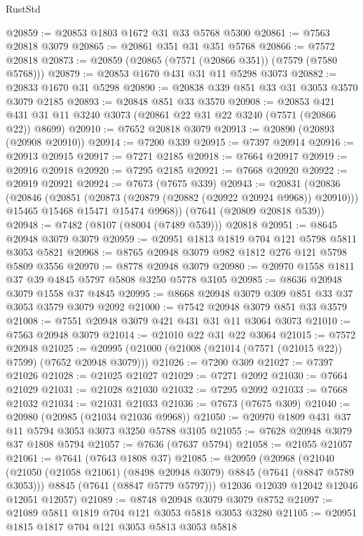 \begin{lexlean}{RustStd}
\begin{coremodule}
@20859 := @20853 @1803 @1672 @31 @33 @5768 @5300
@20861 := @7563 @20818 @3079
@20865 := @20861 @351 @31 @351 @5768
@20866 := @7572 @20818
@20873 := @20859 (@20865 (@7571 (@20866 @351)) (@7579 (@7580 @5768)))
@20879 := @20853 @1670 @431 @31 @11 @5298 @3073
@20882 := @20833 @1670 @31 @5298
@20890 := @20838 @339 @851 @33 @31 @3053 @3570 @3079 @2185
@20893 := @20848 @851 @33 @3570
@20908 := @20853 @421 @431 @31 @11 @3240 @3073 (@20861 @22 @31 @22 @3240 (@7571 (@20866 @22)) @8699)
@20910 := @7652 @20818 @3079
@20913 := @20890 (@20893 (@20908 @20910))
@20914 := @7200 @339
@20915 := @7397 @20914
@20916 := @20913 @20915
@20917 := @7271 @2185
@20918 := @7664 @20917
@20919 := @20916 @20918
@20920 := @7295 @2185
@20921 := @7668 @20920
@20922 := @20919 @20921
@20924 := @7673 (@7675 @339)
@20943 := @20831
    (@20836
      (@20846
        (@20851 (@20873 (@20879 (@20882 (@20922 @20924 @9968)) @20910)))
        @15465
        @15468
        @15471
        @15474
        @9968))
    (@7641 (@20809 @20818 @539))
@20948 := @7482 (@8107 (@8004 (@7489 @539))) @20818
@20951 := @8645 @20948 @3079 @3079
@20959 := @20951 @1813 @1819 @704 @121 @5798 @5811 @3053 @5821
@20968 := @8765 @20948 @3079 @982 @1812 @276 @121 @5798 @5809 @3556
@20970 := @8778 @20948 @3079
@20980 := @20970 @1558 @1811 @37 @39 @4845 @5797 @5808 @3250 @5778 @3105
@20985 := @8636 @20948 @3079 @1558 @37 @4845
@20995 := @8668 @20948 @3079 @309 @851 @33 @37 @3053 @3579 @3079 @2092
@21000 := @7542 @20948 @3079 @851 @33 @3579
@21008 := @7551 @20948 @3079 @421 @431 @31 @11 @3064 @3073
@21010 := @7563 @20948 @3079
@21014 := @21010 @22 @31 @22 @3064
@21015 := @7572 @20948
@21025 := @20995 (@21000 (@21008 (@21014 (@7571 (@21015 @22)) @7599) (@7652 @20948 @3079)))
@21026 := @7200 @309
@21027 := @7397 @21026
@21028 := @21025 @21027
@21029 := @7271 @2092
@21030 := @7664 @21029
@21031 := @21028 @21030
@21032 := @7295 @2092
@21033 := @7668 @21032
@21034 := @21031 @21033
@21036 := @7673 (@7675 @309)
@21040 := @20980 (@20985 (@21034 @21036 @9968))
@21050 := @20970 @1809 @431 @37 @11 @5794 @3053 @3073 @3250 @5788 @3105
@21055 := @7628 @20948 @3079 @37 @1808 @5794
@21057 := @7636 (@7637 @5794)
@21058 := @21055 @21057
@21061 := @7641 (@7643 @1808 @37)
@21085 := @20959
    (@20968
      (@21040
        (@21050 (@21058 @21061) (@8498 @20948 @3079) @8845 (@7641 (@8847 @5789 @3053)))
        @8845
        (@7641 (@8847 @5779 @5797)))
      @12036
      @12039
      @12042
      @12046
      @12051
      @12057)
@21089 := @8748 @20948 @3079 @3079 @8752
@21097 := @21089 @5811 @1819 @704 @121 @3053 @5818 @3053 @3280
@21105 := @20951 @1815 @1817 @704 @121 @3053 @5813 @3053 @5818

\end{coremodule}
\end{lexlean}
